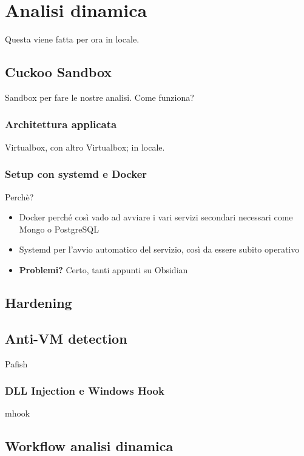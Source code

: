 \chapter{Analisi dinamica}

Questa viene fatta per ora in locale.

\section{Cuckoo Sandbox}
Sandbox per fare le nostre analisi.
Come funziona?

\subsection{Architettura applicata}
Virtualbox, con altro Virtualbox; in locale.

\subsection{Setup con systemd e Docker}
Perchè?
\begin{itemize}
    \item Docker perché così vado ad avviare i vari servizi secondari necessari come Mongo o PostgreSQL
    \item Systemd per l'avvio automatico del servizio, così da essere subito operativo
    \item \textbf{Problemi?} Certo, tanti appunti su Obsidian
\end{itemize}

\section{Hardening}

\section{Anti-VM detection}
Pafish

\subsection{DLL Injection e Windows Hook}
mhook

\section{Workflow analisi dinamica}
